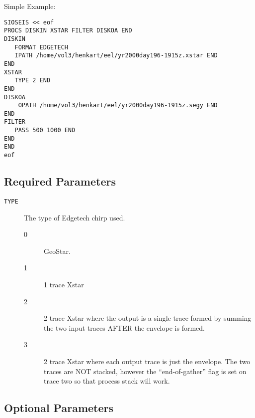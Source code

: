 Simple Example:
\begin{verbatim}
SIOSEIS << eof
PROCS DISKIN XSTAR FILTER DISKOA END
DISKIN
   FORMAT EDGETECH
   IPATH /home/vol3/henkart/eel/yr2000day196-1915z.xstar END
END
XSTAR
   TYPE 2 END
END
DISKOA
    OPATH /home/vol3/henkart/eel/yr2000day196-1915z.segy END
END
FILTER
   PASS 500 1000 END
END
END
eof
\end{verbatim}

\subsection{Required Parameters}
\begin{description}
    \item[\texttt{TYPE}] The type of Edgetech chirp used.
\begin{description}
\item[0] GeoStar.
\item[1] 1 trace Xstar
\item[2] 2 trace Xstar where the output is a single trace formed by summing the two input traces AFTER the envelope is formed.
\item[3] 2 trace Xstar where each output trace is just the envelope.  The two traces are NOT stacked, however the ``end-of-gather'' flag is set on trace two so that process stack will work.
\end{description}
\end{description}

\subsection{Optional Parameters}

